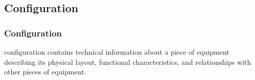 \subsection{Configuration} \label{sec:Configuration}

\subsubsection{Configuration}
  \label{sec:Configuration}


\gls{configuration} contains technical information about a piece of equipment describing its physical layout, functional characteristics, and relationships with other pieces of equipment.

\FloatBarrier
